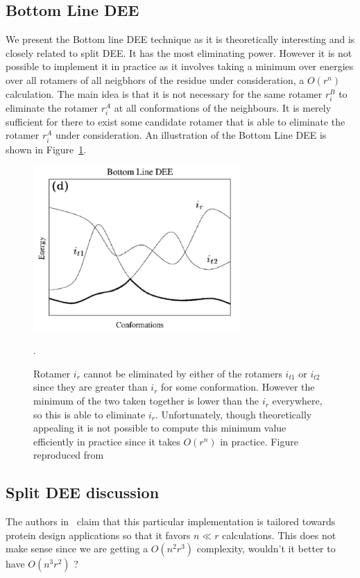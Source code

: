 \documentclass{article}
\begin{document}
\subsection{Bottom Line DEE}
We present the Bottom line DEE technique as it is theoretically interesting and is closely related to split DEE. It has the most eliminating power. However it is not possible to implement it in practice as it involves taking a minimum over energies over all rotamers of all neigbhors of the residue under consideration, a $O(r^n)$ calculation.  The main idea is that it is not necessary for the same rotamer $r_i^B$ to eliminate the rotamer $r_i^A$ at all conformations of the neighbours. It is merely sufficient for there to exist some candidate rotamer that is able to eliminate the rotamer $r_i^A$ under consideration. An illustration of the Bottom Line DEE is shown in Figure~\ref{fig:bottomDEE}.

\begin{figure}[h!]
    \centering
    \includegraphics[width=0.7\textwidth]{pics/bottom.pdf}
    \caption{Rotamer $i_r$ cannot be eliminated by either of the rotamers $i_{t1}$ or $i_{t2}$ since they are greater than $i_r$ for some conformation. However the minimum of the two taken together is lower than the $i_r$ everywhere, so this is able to eliminate $i_r$. Unfortunately, though theoretically appealing it is not possible to compute this minimum value efficiently in practice since it takes $O(r^n)$ in practice. Figure reproduced from~\cite{Pierce2000}}.
    \label{fig:bottomDEE}
\end{figure}

\pagebreak

\subsection*{Split DEE discussion}
The authors in~\cite{Pierce2000} claim that this particular implementation is tailored towards protein design applications so that it favors $n \ll r$ calculations. This does not make sense since we are getting a $O(n^2r^3)$ complexity, wouldn't it better to have $O(n^3r^2)$ ?
\end{document}
